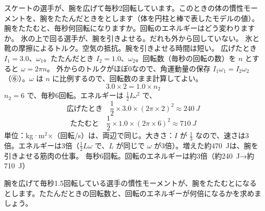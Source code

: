 
\begin{phreidai}[スケートの選手のスピン]
\label{ph:力-6:ex1}スケートの選手が、腕を広げて毎秒2回転しています。このときの体の慣性モーメントを、腕をたたんだときをとします（体を円柱と棒で表したモデルの値）。腕をたたむと、毎秒何回転になりますか。回転のエネルギーはどう変わりますか。
\phbamen
氷の上で回る選手が、腕を引きよせる。だれも外から回していない。
\phmushi
氷と靴の摩擦によるトルク。空気の抵抗。腕を引きよせる時間は短い。
\phzu
広げたとき $I_1=3.0$、$\omega_1$。たたんだとき $I_2=1.0$、$\omega_2$。回転数（毎秒の回転の数）を $n$ とすると $\omega=2\pi n$。
\phriyu
外からのトルクがほぼ0なので、角運動量の保存 $I_1\omega_1=I_2\omega_2$（⑥）。$\omega$ は $n$ に比例するので、回転数のまま計算してよい。
\phtateru
\[ 3.0\times2=1.0\times n_2 \]
\phtoku
$n_2=6$ で、毎秒6回転。エネルギーは $\tfrac{1}{2}I\omega^2$ で、
\[ \text{広げたとき}\quad\frac{1}{2}\times3.0\times(2\pi\times2)^2\approx\qty{240}{J} \]
\[ \text{たたむと}\quad\frac{1}{2}\times1.0\times(2\pi\times6)^2\approx\qty{710}{J} \]
\phtashikame
単位：kg·m$^2$×（回転/s）は、両辺で同じ。\quad 大きさ：$I$ が $\tfrac{1}{3}$ なので、速さは3倍。\quad エネルギーは3倍（$\tfrac{1}{2}L\omega$ で、$L$ が同じで $\omega$ が3倍）。増えた約\qty{470}{J}は、腕を引きよせる筋肉の仕事。
\kotae 毎秒6回転。回転のエネルギーは約3倍（約\qty{240}{J}→約\qty{710}{J}）
\end{phreidai}
\begin{jibun}
腕を広げて毎秒1.5回転している選手の慣性モーメントが、腕をたたむとになるとします。たたんだときの回転数と、回転のエネルギーが何倍になるかを求めましょう。
\end{jibun}

